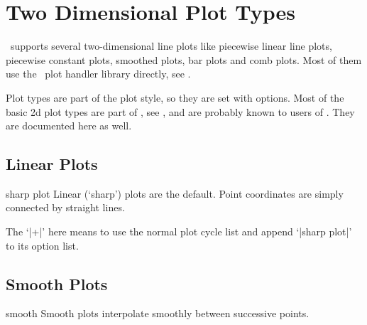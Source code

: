 
\section{Two Dimensional Plot Types}
{
%
\PGFPlots\ supports several two-dimensional line plots like piecewise linear line plots, piecewise constant plots, smoothed plots, bar plots and comb plots. Most of them use the \PGF\ plot handler library directly, see \cite[section 18.8]{tikz}.

Plot types are part of the plot style, so they are set with options. Most of the basic 2d plot types are part of \Tikz, see \cite[section 18.8]{tikz}, and are probably known to users of \Tikz. They are documented here as well.


\subsection{Linear Plots}
\begin{plottype}{sharp plot}
Linear (`sharp') plots are the default. Point coordinates are simply connected by straight lines. 
\begin{codeexample}[]
\end{codeexample}

The `|+|' here means to use the normal plot cycle list and append `|sharp plot|' to its option list.
\end{plottype}

\subsection{Smooth Plots}
\begin{plottype}{smooth}
Smooth plots interpolate smoothly between successive points.
\begin{codeexample}[]
\end{codeexample}
\end{plottype}

}
